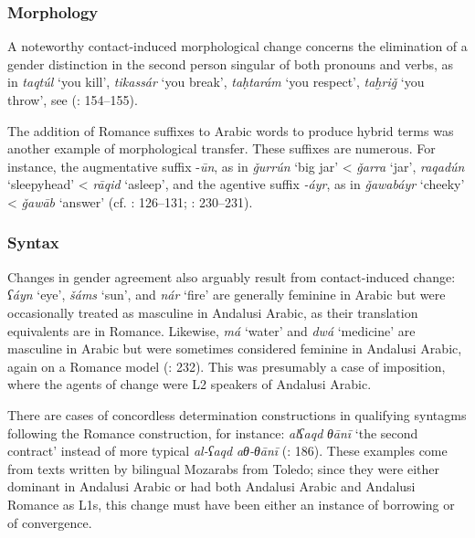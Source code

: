 \documentclass[output=paper,modfonts,nonflat]{langsci/langscibook}
\begin{document}
\subsubsection{Morphology}

A noteworthy contact-induced morphological change concerns the elimination of a gender distinction in the second person singular of both pronouns and verbs, as in \textit{taqtúl} ‘you kill’, \textit{tikassár} ‘you break’, \textit{taḥtarám} ‘you respect’, \textit{taḫriǧ} ‘you throw’, see (\citealt{CorrientePereiraVicente2015}: 154–155).

The addition of Romance suffixes to Arabic words to produce hybrid terms was another example of morphological transfer. These suffixes are numerous. For instance, the augmentative suffix -\textit{ūn}, as in \textit{ǧurrún} ‘big jar’ < \textit{ǧarra} ‘jar’, \textit{raqadún} ‘sleepyhead’ < \textit{rāqid} ‘asleep’, and the agentive suffix \textit{-áyr}, as in \textit{ǧawabáyr} ‘cheeky’ < \textit{ǧawāb} `answer' (cf. \citealt{Corriente1992book}: 126–131; \citealt{CorrientePereiraVicente2015}: 230–231). 


\subsubsection{Syntax}

Changes in gender agreement also arguably result from contact-induced change: \textit{ʕáyn} ‘eye’, \textit{šáms} ‘sun’, and \textit{nár} ‘fire’ are generally feminine in Arabic but were occasionally treated as masculine in Andalusi Arabic, as their translation equivalents are in Romance. Likewise, \textit{má} ‘water’ and \textit{dwá} ‘medicine’ are masculine in Arabic but were sometimes considered feminine in Andalusi Arabic, again on a Romance model (\citealt{CorrientePereiraVicente2015}: 232). This was presumably a case of imposition, where the agents of change were L2 speakers of Andalusi Arabic. 

There are cases of concordless determination constructions in qualifying syntagms following the Romance construction, for instance: \textit{alʕaqd} \textit{θānī} ‘the second contract’ instead of more typical \textit{al-ʕaqd} \textit{aθ-θānī} (\citealt{CorrientePereiraVicente2015}: 186). These examples come from texts written by bilingual Mozarabs from Toledo; since they were either dominant in Andalusi Arabic or had both Andalusi Arabic and Andalusi Romance as L1s, this change must have been either an instance of borrowing or of convergence. 
\end{document}
